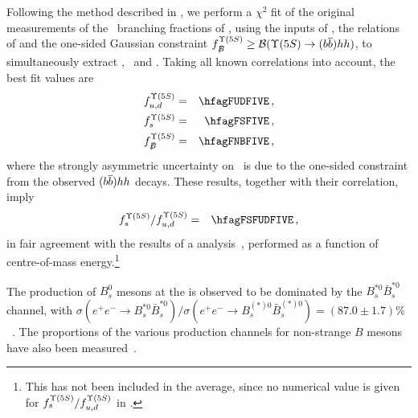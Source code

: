 Following the method described in , 
we perform a $\chi^2$ fit of the original 
measurements of the \Upsfive\ branching fractions of
,
using the inputs of ,
the relations of  and the
one-sided Gaussian constraint $\fnBfive \ge {\cal B}(\Upsfive \to (\b\bar{\b}) hh)$,
to simultaneously extract \fudfive, \fsfive\ and \fnBfive. Taking all known 
correlations into account, the best fit values are
\begin{eqnarray}
\fudfive &=& \hfagFUDFIVE \,, \labe{fudfive} \\
\fsfive  &=& \hfagFSFIVE  \,, \labe{fsfive}  \\
\fnBfive &=& \hfagFNBFIVE \,, \labe{fnBfive}
\end{eqnarray}
where the strongly asymmetric uncertainty on \fnBfive\ is due to the one-sided constraint
from the observed $(\b\bar{\b}) hh$ decays. These results, together with their correlation, 
imply
\begin{eqnarray}
\fsfive/\fudfive  &=& \hfagFSFUDFIVE  \,, \labe{fsfudfive} 
\end{eqnarray}
in fair agreement with the results of a \babar
analysis~\cite{Lees:2011ji}, performed as a function 
of centre-of-mass energy.\footnote{%
\label{foot:life_mix:Lees:2011ji}
This has not been included in the average, since 
no numerical value is given for $f^{\Upsilon(5S)}_{s}/f^{\Upsilon(5S)}_{u,d}$ in 
.
}

The production of $B^0_s$ mesons at the \Upsfive
is observed to be dominated by the $B_s^{*0}\bar{B}_s^{*0}$
channel, %
with $\sigma(e^+e^- \to B_s^{*0}\bar{B}_s^{*0})/%
\sigma(e^+e^- \to B_s^{(*)0}\bar{B}_s^{(*)0})
= (87.0\pm 1.7)\%$~\cite{Li:2011pg,Louvot:2008sc}.
The proportions of the various production channels 
for non-strange $B$ mesons have also been measured~\cite{Drutskoy:2010an}.

